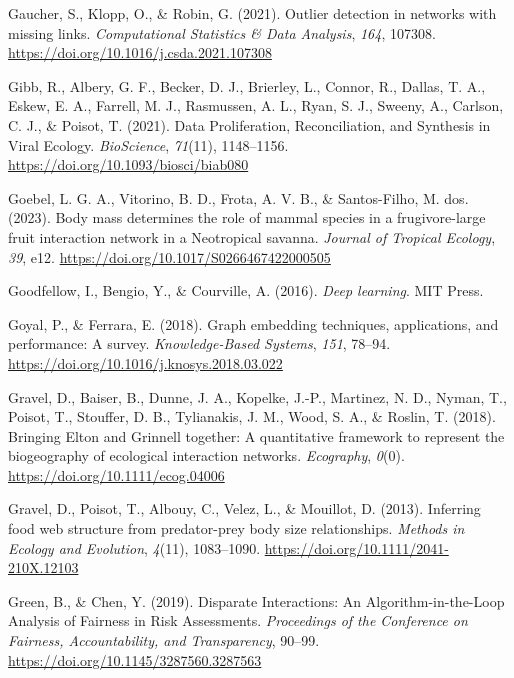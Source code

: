 \documentclass[10pt,oneside]{article}
\newlength{\cslhangindent}
\newenvironment{CSLReferences}[2] %
 {%
  \setlength{\parindent}{0pt}
  \ifodd #1 \everypar{\setlength{\hangindent}{\cslhangindent}}\ignorespaces\fi
  \ifnum #2 > 0
  \setlength{\parskip}{#2\baselineskip}
  \fi
 }%
 {}
\begin{document}
\begin{CSLReferences}{1}{0}
\leavevmode{}%
Gaucher, S., Klopp, O., \& Robin, G. (2021). Outlier detection in
networks with missing links. \emph{Computational Statistics \& Data
Analysis}, \emph{164}, 107308.
\url{https://doi.org/10.1016/j.csda.2021.107308}

\leavevmode{}%
Gibb, R., Albery, G. F., Becker, D. J., Brierley, L., Connor, R.,
Dallas, T. A., Eskew, E. A., Farrell, M. J., Rasmussen, A. L., Ryan, S.
J., Sweeny, A., Carlson, C. J., \& Poisot, T. (2021). Data
Proliferation, Reconciliation, and Synthesis in Viral Ecology.
\emph{BioScience}, \emph{71}(11), 1148--1156.
\url{https://doi.org/10.1093/biosci/biab080}

\leavevmode{}%
Goebel, L. G. A., Vitorino, B. D., Frota, A. V. B., \& Santos-Filho, M.
dos. (2023). Body mass determines the role of mammal species in a
frugivore-large fruit interaction network in a Neotropical savanna.
\emph{Journal of Tropical Ecology}, \emph{39}, e12.
\url{https://doi.org/10.1017/S0266467422000505}

\leavevmode{}%
Goodfellow, I., Bengio, Y., \& Courville, A. (2016). \emph{Deep
learning}. MIT Press.

\leavevmode{}%
Goyal, P., \& Ferrara, E. (2018). Graph embedding techniques,
applications, and performance: A survey. \emph{Knowledge-Based Systems},
\emph{151}, 78--94. \url{https://doi.org/10.1016/j.knosys.2018.03.022}

\leavevmode{}%
Gravel, D., Baiser, B., Dunne, J. A., Kopelke, J.-P., Martinez, N. D.,
Nyman, T., Poisot, T., Stouffer, D. B., Tylianakis, J. M., Wood, S. A.,
\& Roslin, T. (2018). Bringing Elton and Grinnell together: A
quantitative framework to represent the biogeography of ecological
interaction networks. \emph{Ecography}, \emph{0}(0).
\url{https://doi.org/10.1111/ecog.04006}

\leavevmode{}%
Gravel, D., Poisot, T., Albouy, C., Velez, L., \& Mouillot, D. (2013).
Inferring food web structure from predator-prey body size relationships.
\emph{Methods in Ecology and Evolution}, \emph{4}(11), 1083--1090.
\url{https://doi.org/10.1111/2041-210X.12103}

\leavevmode{}%
Green, B., \& Chen, Y. (2019). Disparate Interactions: An
Algorithm-in-the-Loop Analysis of Fairness in Risk Assessments.
\emph{Proceedings of the Conference on Fairness, Accountability, and
Transparency}, 90--99. \url{https://doi.org/10.1145/3287560.3287563}


\end{CSLReferences}
\end{document}

